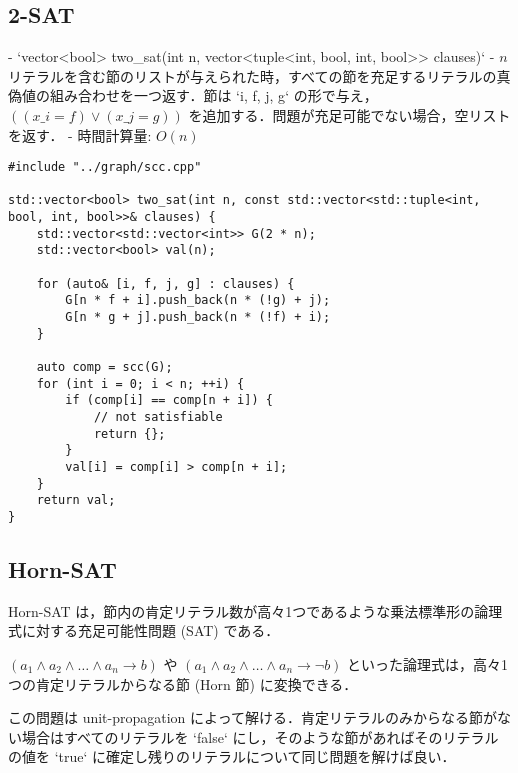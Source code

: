 \subsection{2-SAT}

\begin{small}
\begin{markdown}
- `vector<bool> two\_sat(int n, vector<tuple<int, bool, int, bool>> clauses)`
    - $n$ リテラルを含む節のリストが与えられた時，すべての節を充足するリテラルの真偽値の組み合わせを一つ返す．節は `{i, f, j, g}` の形で与え，$((x\_i = f) \lor (x\_j = g))$ を追加する．問題が充足可能でない場合，空リストを返す．
    - 時間計算量: $O(n)$
\end{markdown}
\end{small}

\begin{lstlisting}
#include "../graph/scc.cpp"

std::vector<bool> two_sat(int n, const std::vector<std::tuple<int, bool, int, bool>>& clauses) {
    std::vector<std::vector<int>> G(2 * n);
    std::vector<bool> val(n);

    for (auto& [i, f, j, g] : clauses) {
        G[n * f + i].push_back(n * (!g) + j);
        G[n * g + j].push_back(n * (!f) + i);
    }

    auto comp = scc(G);
    for (int i = 0; i < n; ++i) {
        if (comp[i] == comp[n + i]) {
            // not satisfiable
            return {};
        }
        val[i] = comp[i] > comp[n + i];
    }
    return val;
}
\end{lstlisting}

\subsection{Horn-SAT}



\begin{small}
Horn-SAT は，節内の肯定リテラル数が高々1つであるような乗法標準形の論理式に対する充足可能性問題 (SAT) である．

$(a_1 \land a_2 \land \dots \land a_n \rightarrow b)$ や $(a_1 \land a_2 \land \dots \land a_n \rightarrow \lnot b)$ といった論理式は，高々1つの肯定リテラルからなる節 (Horn 節) に変換できる．

この問題は unit-propagation によって解ける．肯定リテラルのみからなる節がない場合はすべてのリテラルを `false` にし，そのような節があればそのリテラルの値を `true` に確定し残りのリテラルについて同じ問題を解けば良い．
\end{small}